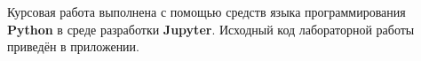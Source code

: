 \documentclass[../body.tex]{subfiles}
\begin{document}
	Курсовая работа выполнена с помощью средств языка программирования \textbf{Python} в среде разработки \textbf{Jupyter}. Исходный код лабораторной работы приведён в приложении.
	
\end{document}
